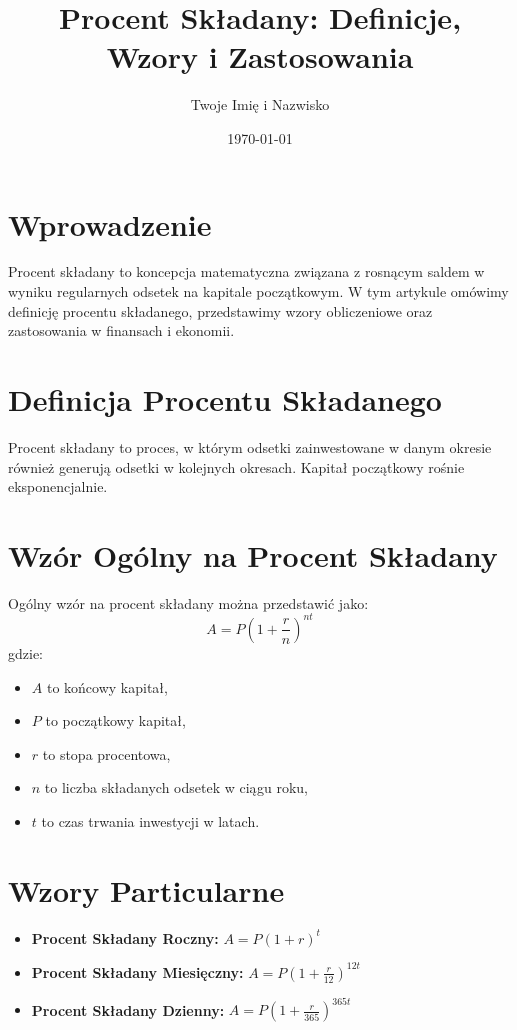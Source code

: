 \documentclass[12pt]{article}
\title{Procent Składany: Definicje, Wzory i Zastosowania}
\author{Twoje Imię i Nazwisko}
\date{\today}
\begin{document}
\maketitle

\section{Wprowadzenie}
Procent składany to koncepcja matematyczna związana z rosnącym saldem w wyniku regularnych odsetek na kapitale początkowym. W tym artykule omówimy definicję procentu składanego, przedstawimy wzory obliczeniowe oraz zastosowania w finansach i ekonomii.

\section{Definicja Procentu Składanego}
\begin{definition}
Procent składany to proces, w którym odsetki zainwestowane w danym okresie również generują odsetki w kolejnych okresach. Kapitał początkowy rośnie eksponencjalnie.
\end{definition}

\section{Wzór Ogólny na Procent Składany}
\begin{theorem}
Ogólny wzór na procent składany można przedstawić jako:
\[
A = P \left(1 + \frac{r}{n}\right)^{nt}
\]
gdzie:
\begin{itemize}
  \item $A$ to końcowy kapitał,
  \item $P$ to początkowy kapitał,
  \item $r$ to stopa procentowa,
  \item $n$ to liczba składanych odsetek w ciągu roku,
  \item $t$ to czas trwania inwestycji w latach.
\end{itemize}
\end{theorem}

\section{Wzory Particularne}
\begin{itemize}
  \item \textbf{Procent Składany Roczny:} $A = P(1 + r)^t$
  
  \item \textbf{Procent Składany Miesięczny:} $A = P\left(1 + \frac{r}{12}\right)^{12t}$
  
  \item \textbf{Procent Składany Dzienny:} $A = P\left(1 + \frac{r}{365}\right)^{365t}$
\end{itemize}
\end{document}
